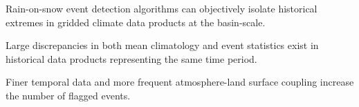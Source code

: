 \documentclass[draft]{agujournal2019}
\begin{document}




\begin{keypoints}
\item Rain-on-snow event detection algorithms can objectively isolate historical extremes in gridded climate data products at the basin-scale.
\item Large discrepancies in both mean climatology and event statistics exist in historical data products representing the same time period.
\item Finer temporal data and more frequent atmosphere-land surface coupling increase the number of flagged events.
\end{keypoints}

%
%

%
%

 
\end{document}
